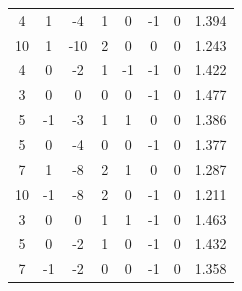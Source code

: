 \documentclass[a4paper, 12pt]{article}
\begin{document}
\begin{table}[H]
\begin{tabular}{@{}cccccccc@{}}
    4                      & 1                      & -4                     & 1                      & 0                 & -1                & 0                 & 1.394               \\
    10                     & 1                      & -10                    & 2                      & 0                 & 0                 & 0                 & 1.243               \\
    4                      & 0                      & -2                     & 1                      & -1                & -1                & 0                 & 1.422               \\
    3                      & 0                      & 0                      & 0                      & 0                 & -1                & 0                 & 1.477               \\
    5                      & -1                     & -3                     & 1                      & 1                 & 0                 & 0                 & 1.386               \\
    5                      & 0                      & -4                     & 0                      & 0                 & -1                & 0                 & 1.377               \\
    7                      & 1                      & -8                     & 2                      & 1                 & 0                 & 0                 & 1.287               \\
    10                     & -1                     & -8                     & 2                      & 0                 & -1                & 0                 & 1.211               \\
    3                      & 0                      & 0                      & 1                      & 1                 & -1                & 0                 & 1.463               \\
    5                      & 0                      & -2                     & 1                      & 0                 & -1                & 0                 & 1.432               \\
    7                      & -1                     & -2                     & 0                      & 0                 & -1                & 0                 & 1.358               \\ \bottomrule
    \end{tabular}
    \end{table} 
\end{document}
